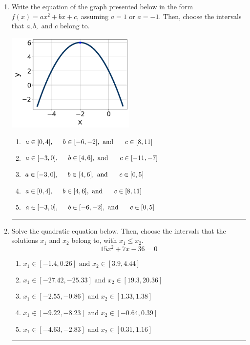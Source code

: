 \documentclass[14pt]{extbook}
\newcommand{\litem}[1]{\item#1\hspace*{-1cm}\rule{\textwidth}{0.4pt}}
\begin{document}
\begin{enumerate}
{\begin{enumerate}[label=\Alph*.]
\end{enumerate} }
\litem{
Write the equation of the graph presented below in the form $f(x)=ax^2+bx+c$, assuming  $a=1$ or $a=-1$. Then, choose the intervals that $a, b,$ and $c$ belong to.
\begin{center}
    \includegraphics[width=0.5\textwidth]{../Figures/quadraticGraphToEquationCopyA.png}
\end{center}
\begin{enumerate}[label=\Alph*.]
\item \( a \in [0, 4], \hspace*{5mm} b \in [-6, -2], \text{ and } \hspace*{5mm} c \in [8, 11] \)
\item \( a \in [-3, 0], \hspace*{5mm} b \in [4, 6], \text{ and } \hspace*{5mm} c \in [-11, -7] \)
\item \( a \in [-3, 0], \hspace*{5mm} b \in [4, 6], \text{ and } \hspace*{5mm} c \in [0, 5] \)
\item \( a \in [0, 4], \hspace*{5mm} b \in [4, 6], \text{ and } \hspace*{5mm} c \in [8, 11] \)
\item \( a \in [-3, 0], \hspace*{5mm} b \in [-6, -2], \text{ and } \hspace*{5mm} c \in [0, 5] \)

\end{enumerate} }
\litem{
Solve the quadratic equation below. Then, choose the intervals that the solutions $x_1$ and $x_2$ belong to, with $x_1 \leq x_2$.\[ 15x^{2} +7 x -36 = 0 \]\begin{enumerate}[label=\Alph*.]
\item \( x_1 \in [-1.4, 0.26] \text{ and } x_2 \in [3.9, 4.44] \)
\item \( x_1 \in [-27.42, -25.33] \text{ and } x_2 \in [19.3, 20.36] \)
\item \( x_1 \in [-2.55, -0.86] \text{ and } x_2 \in [1.33, 1.38] \)
\item \( x_1 \in [-9.22, -8.23] \text{ and } x_2 \in [-0.64, 0.39] \)
\item \( x_1 \in [-4.63, -2.83] \text{ and } x_2 \in [0.31, 1.16] \)


\end{enumerate}}
\end{enumerate}
\end{document}
